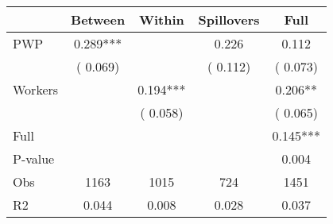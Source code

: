
\begin{tabular}{l*{4}{c}}\hline&\multicolumn{1}{c}{Between}&\multicolumn{1}{c}{Within}&\multicolumn{1}{c}{Spillovers}&\multicolumn{1}{c}{Full}\\ \hline
 PWP           &              0.289***      &                                               &        0.226 &         0.112                            \\ 
                               &        (       0.069)           &                                       &       (       0.112)     &      (       0.073)                                           \\ 
 Workers       &                                               &        0.194***    &                                &             0.206**                            \\ 
                               &                                               & (       0.058)                  &                                        &      (       0.065)                                           \\ 
\hline                                                                                                                                                                                                                                            
 Full                  &                                               &                                               &                                        &             0.145***                                     \\ 
 P-value               &                                               &                                               &                                        &             0.004                                           \\ 
 Obs                   &               1163               &       1015                       &       724                &              1451                                               \\ 
 R2                    &                      0.044              &              0.008                      &              0.028               &                     0.037                                              \\ 
\hline \end{tabular}                                                                                                                                                                                                              